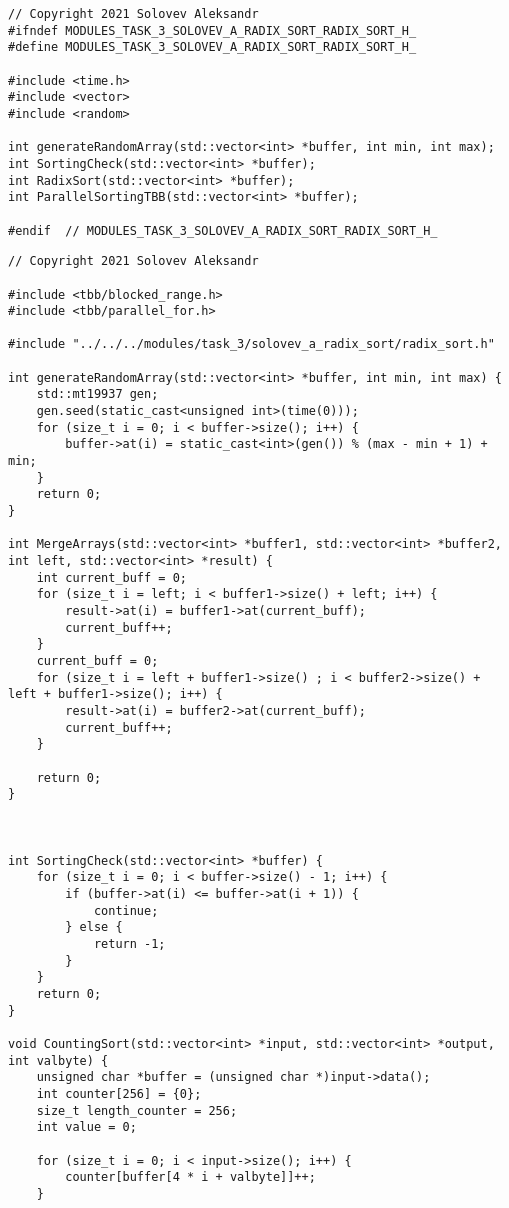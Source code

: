 \documentclass{report}
\begin{document}
\begin{lstlisting}
// Copyright 2021 Solovev Aleksandr
#ifndef MODULES_TASK_3_SOLOVEV_A_RADIX_SORT_RADIX_SORT_H_
#define MODULES_TASK_3_SOLOVEV_A_RADIX_SORT_RADIX_SORT_H_

#include <time.h>
#include <vector>
#include <random>

int generateRandomArray(std::vector<int> *buffer, int min, int max);
int SortingCheck(std::vector<int> *buffer);
int RadixSort(std::vector<int> *buffer);
int ParallelSortingTBB(std::vector<int> *buffer);

#endif  // MODULES_TASK_3_SOLOVEV_A_RADIX_SORT_RADIX_SORT_H_

\end{lstlisting}
\begin{lstlisting}
// Copyright 2021 Solovev Aleksandr

#include <tbb/blocked_range.h>
#include <tbb/parallel_for.h>

#include "../../../modules/task_3/solovev_a_radix_sort/radix_sort.h"

int generateRandomArray(std::vector<int> *buffer, int min, int max) {
    std::mt19937 gen;
    gen.seed(static_cast<unsigned int>(time(0)));
    for (size_t i = 0; i < buffer->size(); i++) {
        buffer->at(i) = static_cast<int>(gen()) % (max - min + 1) + min;
    }
    return 0;
}

int MergeArrays(std::vector<int> *buffer1, std::vector<int> *buffer2, int left, std::vector<int> *result) {
    int current_buff = 0;
    for (size_t i = left; i < buffer1->size() + left; i++) {
        result->at(i) = buffer1->at(current_buff);
        current_buff++;
    }
    current_buff = 0;
    for (size_t i = left + buffer1->size() ; i < buffer2->size() + left + buffer1->size(); i++) {
        result->at(i) = buffer2->at(current_buff);
        current_buff++;
    }

    return 0;
}



int SortingCheck(std::vector<int> *buffer) {
    for (size_t i = 0; i < buffer->size() - 1; i++) {
        if (buffer->at(i) <= buffer->at(i + 1)) {
            continue;
        } else {
            return -1;
        }
    }
    return 0;
}

void CountingSort(std::vector<int> *input, std::vector<int> *output, int valbyte) {
    unsigned char *buffer = (unsigned char *)input->data();
    int counter[256] = {0};
    size_t length_counter = 256;
    int value = 0;

    for (size_t i = 0; i < input->size(); i++) {
        counter[buffer[4 * i + valbyte]]++;
    }


\end{lstlisting}
\end{document}
